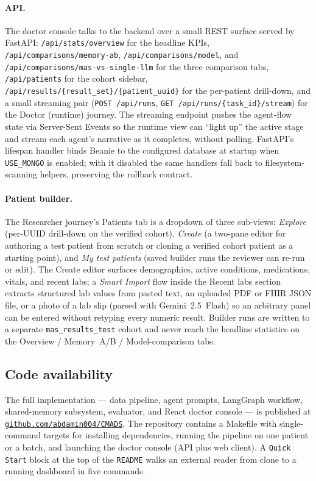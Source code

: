 \paragraph{API.}
The doctor console talks to the backend over a small REST surface
served by FastAPI: \texttt{/api/stats/overview} for the headline
KPIs, \texttt{/api/comparisons/memory-ab},
\texttt{/api/comparisons/model}, and
\texttt{/api/comparisons/mas-vs-single-llm} for the three
comparison tabs, \texttt{/api/patients} for the cohort sidebar,
\texttt{/api/results/\{result\_set\}/\{patient\_uuid\}} for the
per-patient drill-down, and a small streaming pair
(\texttt{POST /api/runs}, \texttt{GET /api/runs/\{task\_id\}/stream})
for the Doctor (runtime) journey. The streaming endpoint pushes the
agent-flow state via Server-Sent Events so the runtime view can
``light up'' the active stage and stream each agent's narrative as it
completes, without polling. FastAPI's lifespan handler binds Beanie
to the configured database at startup when
\texttt{USE\_MONGO} is enabled; with it disabled the same handlers
fall back to filesystem-scanning helpers, preserving the rollback
contract.

\paragraph{Patient builder.}
The Researcher journey's Patients tab is a dropdown of three
sub-views: \emph{Explore} (per-UUID drill-down on the verified
cohort), \emph{Create} (a two-pane editor for authoring a test
patient from scratch or cloning a verified cohort patient as a
starting point), and \emph{My test patients} (saved builder runs the
reviewer can re-run or edit). The Create editor surfaces demographics,
active conditions, medications, vitals, and recent labs; a
\emph{Smart Import} flow inside the Recent labs section extracts
structured lab values from pasted text, an uploaded PDF or FHIR JSON
file, or a photo of a lab slip (parsed with Gemini~2.5~Flash) so an
arbitrary panel can be entered without retyping every numeric result.
Builder runs are written to a separate \texttt{mas\_results\_test}
cohort and never reach the headline statistics on the Overview /
Memory~A/B / Model-comparison tabs.

\subsection*{Code availability}
The full implementation --- data pipeline, agent prompts, LangGraph workflow,
shared-memory subsystem, evaluator, and React doctor console --- is published
at \href{https://github.com/abdamin004/CMADS}{\texttt{github.com/abdamin004/CMADS}}.
The repository contains a Makefile with single-command targets for installing
dependencies, running the pipeline on one patient or a batch, and launching
the doctor console (API plus web client). A \texttt{Quick Start} block at the
top of the \texttt{README} walks an external reader from clone to a running
dashboard in five commands.


